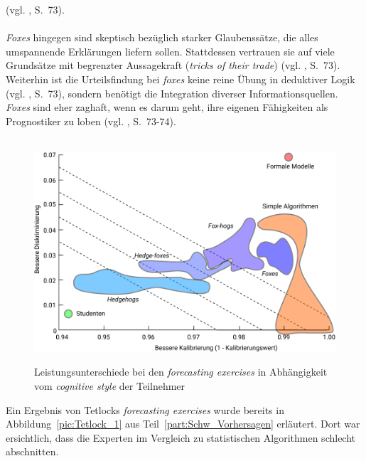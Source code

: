 (vgl. \cite{Tetlock}, S.~73). \\ \\
\emph{Foxes} hingegen sind skeptisch bezüglich starker Glaubenssätze, die alles
umspannende Erklärungen liefern sollen. Stattdessen vertrauen sie auf viele
Grundsätze mit begrenzter Aussagekraft (\emph{tricks of their trade}) (vgl.
\cite{Tetlock}, S.~73). Weiterhin ist die Urteilsfindung bei \emph{foxes} keine
reine Übung in deduktiver Logik (vgl. \cite{Tetlock}, S.~73), sondern benötigt
die Integration diverser Informationsquellen. \emph{Foxes} sind eher zaghaft,
wenn es darum geht, ihre eigenen Fähigkeiten als Prognostiker zu loben (vgl.
\cite{Tetlock}, S.~73-74). \\ \\
\begin{figure}%
\centering
\caption{Leistungsunterschiede bei den \emph{forecasting exercises} in
  Abhängigkeit vom \emph{cognitive style} der Teilnehmer}
\includegraphics[scale=0.88]{Grafiken/Tetlock_2_Ink.pdf} 
\label{pic:Tetlock_2}
\end{figure}
Ein Ergebnis von Tetlocks \emph{forecasting exercises} wurde bereits in
Abbildung~\ref{pic:Tetlock_1} aus Teil~\ref{part:Schw_Vorhersagen} erläutert.
Dort war ersichtlich, dass die Experten im Vergleich zu statistischen
Algorithmen schlecht abschnitten. 

